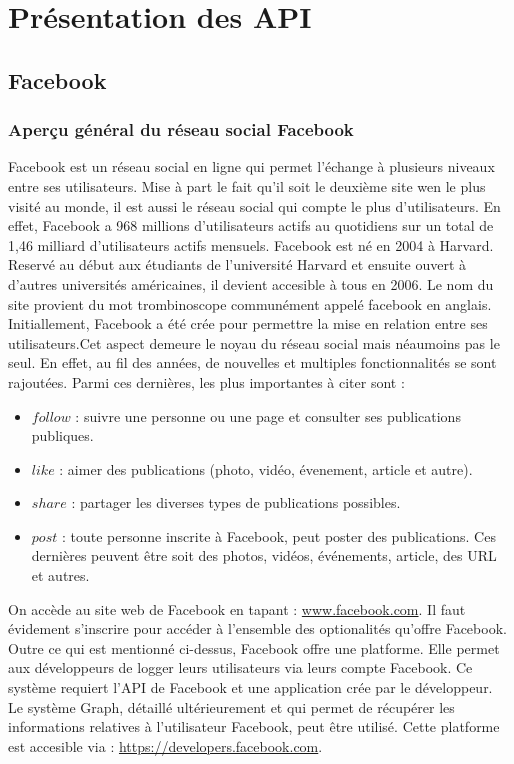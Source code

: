 \chapter{Présentation des API}

\section{Facebook}
\subsection{Aperçu général du réseau social Facebook}

Facebook est un réseau social en ligne qui permet l'échange à plusieurs niveaux entre ses utilisateurs. Mise à part le fait qu'il soit le deuxième site wen le plus visité au monde, il est aussi le réseau social qui compte le plus d'utilisateurs. En effet, Facebook a 968 millions d'utilisateurs actifs au quotidiens sur un total de 1,46 milliard d'utilisateurs actifs mensuels.
Facebook est né en 2004 à Harvard. Reservé au début aux étudiants de l'université Harvard et ensuite ouvert à d'autres universités américaines, il devient accesible à tous en 2006. Le nom du site provient du mot trombinoscope communément appelé facebook en anglais. 
Initiallement, Facebook a été crée pour permettre la mise en relation entre ses utilisateurs.Cet aspect demeure le noyau du réseau social mais néaumoins pas le seul. En effet, au fil des années, de nouvelles et multiples fonctionnalités se sont rajoutées. Parmi ces dernières, les plus importantes à citer sont : 
\begin{itemize}
\item $follow$ : suivre une personne ou une page et consulter ses publications publiques.
\item $like$ : aimer des publications (photo, vidéo, évenement, article et autre).
\item $share$ : partager les diverses types de publications possibles.
\item $post$ : toute personne inscrite à Facebook, peut poster des publications. Ces dernières peuvent être soit des photos, vidéos, événements, article, des URL et autres.
\end{itemize}
On accède au site web de Facebook en tapant : \url{www.facebook.com}. Il faut évidement s'inscrire pour accéder à l'ensemble des optionalités qu'offre Facebook.\\
Outre ce qui est mentionné ci-dessus, Facebook offre une platforme. Elle permet aux développeurs de logger leurs utilisateurs via leurs compte Facebook. Ce système requiert l'API de Facebook et une application crée par le développeur. Le système Graph, détaillé ultérieurement et qui permet de récupérer les informations relatives à l'utilisateur Facebook, peut être utilisé. Cette platforme est accesible via : \url{https://developers.facebook.com}.

